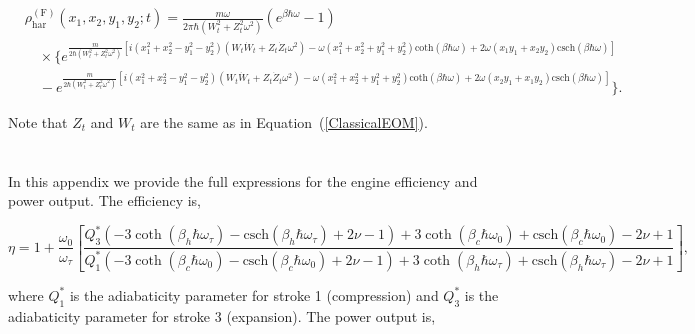 \documentclass[preprints,article,accept,moreauthors,pdftex]{Definitions/mdpi}
\begin{document}
\begin{paracol}{2}
\vspace{-9pt}
\begin{adjustwidth}{-4.6cm}{0cm}
\begin{equation}
	\begin{split}
		&\rho_{\mathrm{har}}^{(\mathrm{F})}(x_1,x_2,y_1,y_2;t)= \frac{m \omega}{2 \pi \hbar (W_t^2+Z_t^2 \omega^2)} \left(e^{ \beta \hbar \omega}-1\right) \\
		&\quad\times\bigg\{ e^{\frac{m}{2 \hbar (W_t^2+Z_t^2 \omega^2)}\left[i (x_1^2+x_2^2-y_1^2-y_2^2)(W_t \dot{W}_t+Z_t\dot{Z}_t\omega^2)-\omega (x_1^2+x_2^2+y_1^2+y_2^2) \mathrm{coth}(\beta \hbar \omega)
			+2 \omega (x_1 y_1 +x_2 y_2) \mathrm{csch}(\beta \hbar \omega) \right]} \\
		&\quad- e^{\frac{m}{2 \hbar (W_t^2+Z_t^2 \omega^2)}\left[i (x_1^2+x_2^2-y_1^2-y_2^2)(W_t \dot{W}_t+Z_t\dot{Z}_t\omega^2)
			- \omega(x_1^2+x_2^2+y_1^2+y_2^2) \mathrm{coth}(\beta \hbar \omega)+2 \omega (x_2 y_1 +x_1 y_2) \mathrm{csch}(\beta \hbar \omega) \right]} \bigg\}.
	\end{split}
\end{equation}
\end{adjustwidth}

Note that $Z_t$ and $W_t$ are the same as in Equation~(\ref{ClassicalEOM}).

\section{}
\label{AppendixB} 

In this appendix we provide the full expressions for the engine efficiency and power output. The efficiency is,
\begin{adjustwidth}{-4.6cm}{0cm}
\begin{equation}
	\eta = 1 + \frac{\omega_0}{\omega _{\tau }}\left[\frac{Q^*_{3} \left(-3 \coth \left(\beta _h \hbar \omega_{\tau}\right)-\text{csch}\left(\beta _h \hbar \omega_{\tau}\right)+2 \nu -1\right)+3 \coth \left(\beta_c \hbar \omega _0 \right)+\text{csch}\left(\beta_c \hbar \omega _0\right)-2 \nu +1}{Q^*_{1} \left(-3 \coth \left(\beta_c \hbar \omega _0\right)-\text{csch}\left(\beta_c \hbar \omega _0\right)+2 \nu -1\right)+3 \coth \left(\beta _h \hbar \omega_{\tau} \right)+\text{csch}\left(\beta _h \hbar \omega_{\tau}\right)-2 \nu+1}\right],
\end{equation}
\end{adjustwidth}
where $Q^*_1$ is the adiabaticity parameter for stroke 1 (compression) and $Q^*_3$ is the adiabaticity parameter for stroke 3 (expansion). The power output is,


\end{paracol}
\end{document}

